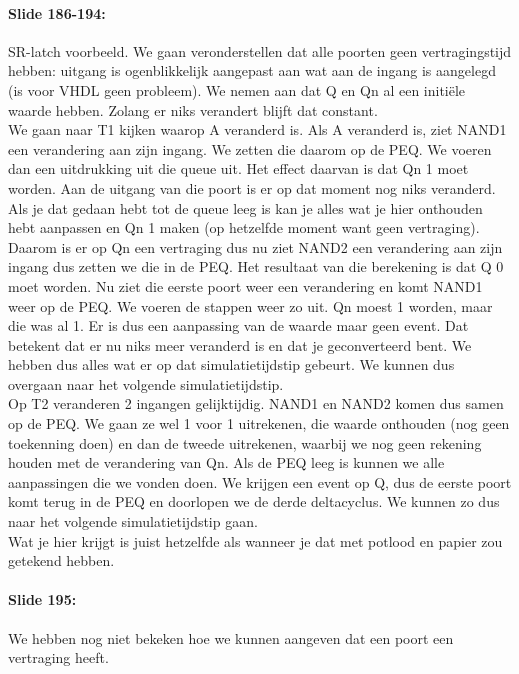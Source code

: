 \documentclass[10pt,a4paper]{book}
\begin{document}
\paragraph{Slide 186-194:} SR-latch voorbeeld. We gaan veronderstellen dat alle poorten geen vertragingstijd hebben: uitgang is ogenblikkelijk aangepast aan wat aan de ingang is aangelegd (is voor VHDL geen probleem).  We nemen aan dat Q en Qn al een initi\"ele waarde hebben. Zolang er niks verandert blijft dat constant.\\
We gaan naar T1 kijken waarop A veranderd is. Als A veranderd is, ziet NAND1 een verandering aan zijn ingang. We zetten die daarom op de PEQ. We voeren dan een uitdrukking uit die queue uit. Het effect daarvan is dat Qn 1 moet worden. Aan de uitgang van die poort is er op dat moment nog niks veranderd. Als je dat gedaan hebt tot de queue leeg is kan je alles wat je hier onthouden hebt aanpassen en Qn 1 maken (op hetzelfde moment want geen vertraging). Daarom is er op Qn een vertraging dus nu ziet NAND2 een verandering aan zijn ingang dus zetten we die in de PEQ. Het resultaat van die berekening is dat Q 0 moet worden. Nu ziet die eerste poort weer een verandering en komt NAND1 weer op de PEQ. We voeren de stappen weer zo uit. Qn moest 1 worden, maar die was al 1. Er is dus een aanpassing van de waarde maar geen event. Dat betekent dat er nu niks meer veranderd is en dat je geconverteerd bent. We hebben dus alles wat er op dat simulatietijdstip gebeurt. We kunnen dus overgaan naar het volgende simulatietijdstip.\\
Op T2 veranderen 2 ingangen gelijktijdig. NAND1 en NAND2 komen dus samen op de PEQ. We gaan ze wel 1 voor 1 uitrekenen, die waarde onthouden (nog geen toekenning doen) en dan de tweede uitrekenen, waarbij we nog geen rekening houden met de verandering van Qn. Als de PEQ leeg is kunnen we alle aanpassingen die we vonden doen. We krijgen een event op Q, dus de eerste poort komt terug in de PEQ en doorlopen we de derde deltacyclus. We kunnen zo dus naar het volgende simulatietijdstip gaan.\\
Wat je hier krijgt is juist hetzelfde als wanneer je dat met potlood en papier zou getekend hebben. 

\paragraph{Slide 195:} We hebben nog niet bekeken hoe we kunnen aangeven dat een poort een vertraging heeft.
\end{document}
